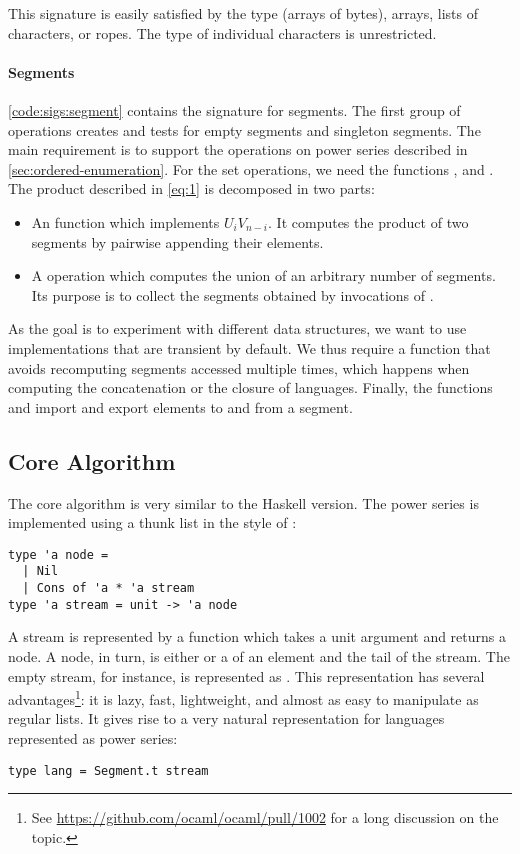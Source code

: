 This signature is easily satisfied by the \ocaml {}
type (\ie arrays of bytes), arrays, lists of characters, or ropes. The
type of individual characters is unrestricted.

\paragraph{Segments}

\autoref{code:sigs:segment} contains the signature for segments.
The first group of operations creates and tests for empty segments and
singleton segments. 
The main requirement is to support the operations on power series described in
\autoref{sec:ordered-enumeration}.
For the set operations, we need the functions
,  and .
%
The product described in \autoref{eq:1} is decomposed in two parts:
\begin{itemize}
\item An  function which implements $U_i V_{n-i}$. It computes the
  product of two segments by pairwise appending their elements.
\item A  operation which computes the union of an arbitrary number
  of segments. Its purpose is to collect the segments obtained
  by invocations of .
\end{itemize}
%
As the goal is to experiment with different data structures, we want
to use implementations that are transient by default. We thus require 
a function  that avoids recomputing segments accessed
multiple times, which happens when computing the concatenation or the closure of languages. 
%
Finally, the functions   and  import and
export elements to and from a segment.

\subsection{Core Algorithm}

The core algorithm is very similar to the Haskell version. The power series
is implemented using a thunk list in the style of \citet{DBLP:conf/cpp/Pottier17}:

\begin{lstlisting}
type 'a node =
  | Nil
  | Cons of 'a * 'a stream
type 'a stream = unit -> 'a node
\end{lstlisting}

A stream is represented by a function which takes a unit argument and returns
a node. A node, in turn, is either  or a  of an
element and the tail of the stream. The empty stream, for instance, is
represented as .
This representation has several advantages\footnote{See
  \url{https://github.com/ocaml/ocaml/pull/1002} for a long discussion
  on the topic.}: it is lazy, fast, lightweight, and almost as easy to
manipulate as regular lists. 
It gives rise to a very natural representation for languages represented as power series:
\begin{lstlisting}[numbers=none]
type lang = Segment.t stream
\end{lstlisting}

